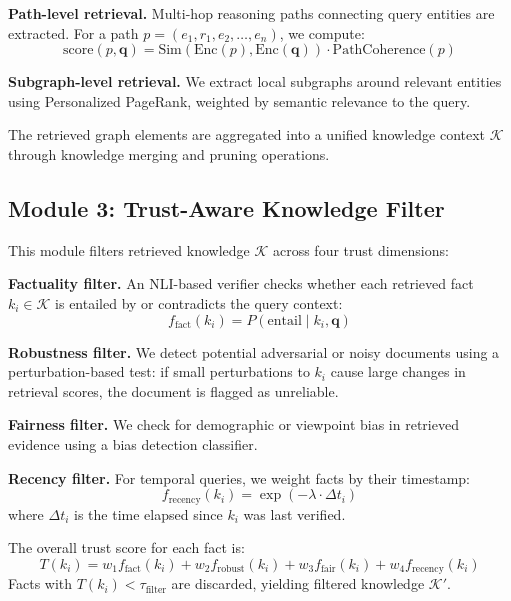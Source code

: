 \documentclass[11pt,a4paper]{article}
\begin{document}
\textbf{Path-level retrieval.} Multi-hop reasoning paths connecting query entities are extracted. For a path $p = (e_1, r_1, e_2, \ldots, e_n)$, we compute:
\begin{equation}
    \text{score}(p, \mathbf{q}) = \text{Sim}(\text{Enc}(p), \text{Enc}(\mathbf{q})) \cdot \text{PathCoherence}(p)
\end{equation}

\textbf{Subgraph-level retrieval.} We extract local subgraphs around relevant entities using Personalized PageRank, weighted by semantic relevance to the query.

The retrieved graph elements are aggregated into a unified knowledge context $\mathcal{K}$ through knowledge merging and pruning operations.

\subsection{Module 3: Trust-Aware Knowledge Filter}

This module filters retrieved knowledge $\mathcal{K}$ across four trust dimensions:

\textbf{Factuality filter.} An NLI-based verifier checks whether each retrieved fact $k_i \in \mathcal{K}$ is entailed by or contradicts the query context:
\begin{equation}
    f_{\text{fact}}(k_i) = P(\text{entail} \mid k_i, \mathbf{q})
\end{equation}

\textbf{Robustness filter.} We detect potential adversarial or noisy documents using a perturbation-based test: if small perturbations to $k_i$ cause large changes in retrieval scores, the document is flagged as unreliable.

\textbf{Fairness filter.} We check for demographic or viewpoint bias in retrieved evidence using a bias detection classifier.

\textbf{Recency filter.} For temporal queries, we weight facts by their timestamp:
\begin{equation}
    f_{\text{recency}}(k_i) = \exp(-\lambda \cdot \Delta t_i)
\end{equation}
where $\Delta t_i$ is the time elapsed since $k_i$ was last verified.

The overall trust score for each fact is:
\begin{equation}
    T(k_i) = w_1 f_{\text{fact}}(k_i) + w_2 f_{\text{robust}}(k_i) + w_3 f_{\text{fair}}(k_i) + w_4 f_{\text{recency}}(k_i)
\end{equation}
Facts with $T(k_i) < \tau_{\text{filter}}$ are discarded, yielding filtered knowledge $\mathcal{K}'$.
\end{document}
